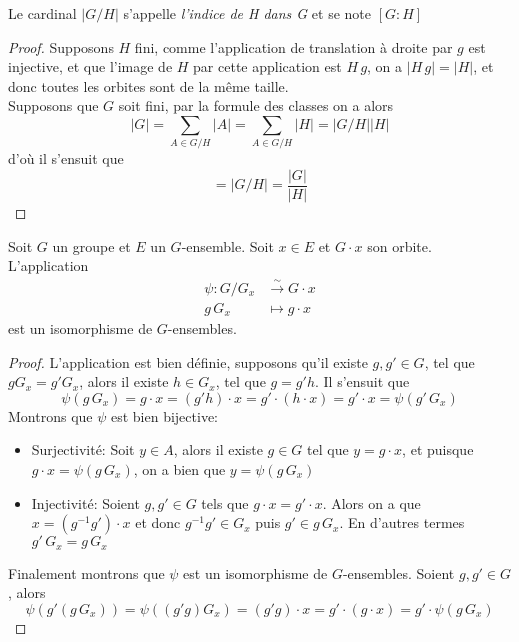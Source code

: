 \begin{notation}
	Le cardinal $|G/H|$ s'appelle \emph{l'indice de H dans G} et se note
	$[G : H]$
\end{notation}

\begin{proof}
	Supposons $H$ fini, comme l'application de translation à droite par $g$ est injective,
	et que l'image de $H$ par cette application est $H\,g$,
	on a $|H\,g| = |H|$, et donc toutes les orbites sont de la même taille.\\
	Supposons que $G$ soit fini, par la formule des classes on a alors
	\begin{equation*}
		|G| = \sum_{A \in G/H}|A| = \sum_{A \in G/H}|H| = |G/H||H|
	\end{equation*}
	d'où il s'ensuit que
	\begin{equation*}
		[G:H] = |G/H| = \frac{|G|}{|H|}
	\end{equation*}
\end{proof}

\begin{theorem}
	Soit $G$ un groupe et $E$ un $G$-ensemble.
	Soit $x \in E$ et $G \cdot x$ son orbite.
	L'application
	\begin{align*}
		\psi : G/G_x &\xrightarrow{\sim} G \cdot x\\
		g\,G_x &\mapsto g \cdot x
	\end{align*}
	est un isomorphisme de $G$-ensembles.
\end{theorem}

\begin{proof}
	L'application est bien définie, supposons qu'il existe $g, g' \in G$,
	tel que $g G_x = g' G_x$, alors il existe $h \in G_x$,
	tel que $g = g' h$. Il s'ensuit que
	\begin{equation*}
		\psi(g\,G_x) = g \cdot x = (g' h) \cdot x
		= g' \cdot (h \cdot x) = g' \cdot x = \psi(g'\,G_x)
	\end{equation*}
	Montrons que $\psi$ est bien bijective:
	\begin{itemize}
		\item Surjectivité: Soit $y \in A$, alors il existe $g \in G$
			tel que $y = g \cdot x$, et puisque $g \cdot x = \psi(g\,G_x)$,
			on a bien que $y = \psi(g\,G_x)$
		\item Injectivité: Soient $g, g' \in G$ tels que
			$g \cdot x = g' \cdot x$. Alors on a que $x = (g^{-1} g') \cdot x$ et donc
			$g^{-1} g' \in G_x$ puis $g' \in g\,G_x$.
			En d'autres termes $g'\,G_x = g\,G_x$
	\end{itemize}
	Finalement montrons que $\psi$ est un isomorphisme de $G$-ensembles.
	Soient $g, g'\in G$, alors
	\begin{equation*}
		\psi(g'(g\,G_x)) = \psi((g' g) G_x)
			= (g' g) \cdot x = g' \cdot (g \cdot x) = g' \cdot \psi(g\,G_x)
	\end{equation*}
\end{proof}

